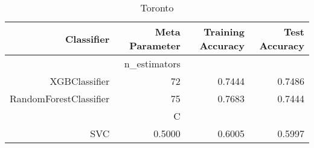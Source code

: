 
\begin{table}[H]
    \caption{Toronto}
    \centering
    \begin{tabular}{|r|r|r|r|}
        \hline
        Classifier &Meta Parameter &Training Accuracy
        &Test Accuracy\\
        \hline
        &n\_estimators &\multicolumn{2}{|r|}{}\\
        \hline
        XGBClassifier &72 &0.7444 &0.7486\\
        \hline
        RandomForestClassifier &75 &0.7683 &0.7444\\
        \hline
        &C &\multicolumn{2}{|r|}{}\\
        \hline
        SVC &0.5000 &0.6005 &0.5997\\
        \hline
    \end{tabular}
\end{table}
